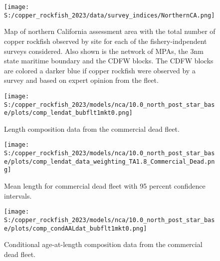 \documentclass[11pt,
  letterpaper,
]{article}
\begin{document}
\begin{figure}
{\centering
\texttt{[image: S:/copper\_rockfish\_2023/data/survey\_indices/NorthernCA.png]}
}
\caption{Map of northern California assessment area with the total number of copper rockfish observed by site for each of the fishery-indpendent surveys considered. Also shown is the network of MPAs, the 3nm state maritime boundary and the CDFW blocks. The CDFW blocks are colored a darker blue if copper rockfish were observed by a survey and based on expert opinion from the fleet.\label{fig:survey-map}}
\end{figure}

\begin{figure}
{\centering
\texttt{[image: S:/copper\_rockfish\_2023/models/nca/10.0\_north\_post\_star\_base/plots/comp\_lendat\_bubflt1mkt0.png]}
}
\caption{Length composition data from the commercial dead fleet.\label{fig:com-dead-len-data}}
\end{figure}

\begin{figure}
{\centering
\texttt{[image: S:/copper\_rockfish\_2023/models/nca/10.0\_north\_post\_star\_base/plots/comp\_lendat\_data\_weighting\_TA1.8\_Commercial\_Dead.png]}
}
\caption{Mean length for commercial dead fleet with 95 percent confidence intervals.\label{fig:mean-com-dead-len-data}}
\end{figure}

\begin{figure}
{\centering
\texttt{[image: S:/copper\_rockfish\_2023/models/nca/10.0\_north\_post\_star\_base/plots/comp\_condAALdat\_bubflt1mkt0.png]}
}
\caption{Conditional age-at-length composition data from the commercial dead fleet.\label{fig:com-dead-age-data}}
\end{figure}
\end{document}
